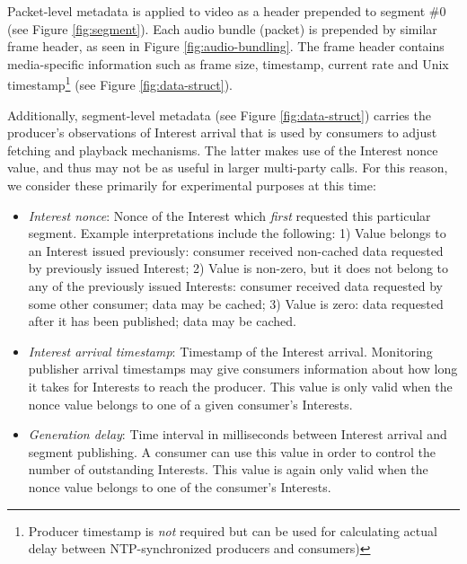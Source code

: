 \documentclass{icn/sig-alternate-2013} %
\begin{document}
Packet-level metadata is applied to video as a header prepended to segment \#0 (see Figure \ref{fig:segment}). Each audio bundle (packet) is prepended by similar frame header, as seen in Figure \ref{fig:audio-bundling}. 
The frame header contains media-specific information such as frame size, timestamp, current rate and Unix timestamp\footnote{Producer timestamp is \textit{not} required but can be used for calculating actual delay between NTP-synchronized producers and consumers)} (see Figure \ref{fig:data-struct}).

Additionally, segment-level metadata (see Figure \ref{fig:data-struct}) carries the producer's observations of Interest arrival that is used by consumers to adjust fetching and playback mechanisms.  
The latter makes use of the Interest nonce value, and thus may not be as useful in larger multi-party calls. 
For this reason, we consider these primarily for experimental purposes at this time:
\begin{itemize} [label={}]
\item \textit{Interest nonce}: Nonce of the Interest which \textit{first} requested this particular segment. Example interpretations include the following:  1) Value belongs to an Interest issued previously: consumer received non-cached data requested by previously issued Interest; 2) Value is non-zero, but it does not belong to any of the previously issued Interests:  consumer received data requested by some other consumer; data may be cached; 3) Value is zero: data requested after it has been published; data may be cached.
\item \textit{Interest arrival timestamp}: Timestamp of the Interest arrival. Monitoring publisher arrival timestamps may give consumers information about how long it takes for Interests to reach the producer. This value is only valid when the nonce value belongs to one of a given consumer's Interests.
\item \textit{Generation delay}: Time interval in milliseconds between Interest arrival and segment publishing. A consumer can use this value in order to control the number of outstanding Interests. This value is again only valid when the nonce value belongs to one of the consumer's Interests.
\end{itemize}
\end{document}
